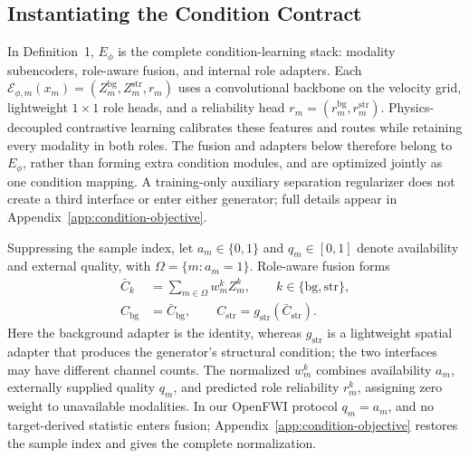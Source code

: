\subsection{Instantiating the Condition Contract}
In Definition~1, $E_\phi$ is the complete condition-learning stack: modality subencoders, role-aware fusion, and internal role adapters. Each $\mathcal E_{\phi,m}(x_m)=(Z_m^{\mathrm{bg}},Z_m^{\mathrm{str}},r_m)$ uses a convolutional backbone on the velocity grid, lightweight $1\times1$ role heads, and a reliability head $r_m=(r_m^{\mathrm{bg}},r_m^{\mathrm{str}})$. Physics-decoupled contrastive learning calibrates these features and routes while retaining every modality in both roles. The fusion and adapters below therefore belong to $E_\phi$, rather than forming extra condition modules, and are optimized jointly as one condition mapping. A training-only auxiliary separation regularizer does not create a third interface or enter either generator; full details appear in Appendix~\ref{app:condition-objective}.

Suppressing the sample index, let $a_m\in\{0,1\}$ and $q_m\in[0,1]$ denote availability and external quality, with $\Omega=\{m:a_m=1\}$. Role-aware fusion forms
\begin{align}
\bar C_k
&=\sum_{m\in\Omega}w_m^k Z_m^k,
\qquad k\in\{\mathrm{bg},\mathrm{str}\},\nonumber\\
C_{\mathrm{bg}}&=\bar C_{\mathrm{bg}},\qquad
C_{\mathrm{str}}=g_{\mathrm{str}}(\bar C_{\mathrm{str}}).
\label{eq:reliability-fusion}
\end{align}
Here the background adapter is the identity, whereas $g_{\mathrm{str}}$ is a lightweight spatial adapter that produces the generator's structural condition; the two interfaces may have different channel counts. The normalized $w_m^k$ combines availability $a_m$, externally supplied quality $q_m$, and predicted role reliability $r_m^k$, assigning zero weight to unavailable modalities. In our OpenFWI protocol $q_m=a_m$, and no target-derived statistic enters fusion; Appendix~\ref{app:condition-objective} restores the sample index and gives the complete normalization.

